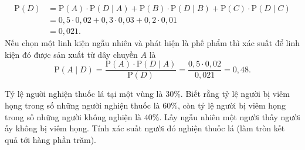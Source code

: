 \begin{bt}
{\begin{align*}
			\mathrm{P}\left(D\right)&=\mathrm{P}\left(A\right)\cdot\mathrm{P}\left(D\mid A\right)+\mathrm{P}\left(B\right)\cdot\mathrm{P}\left(D\mid B\right)+\mathrm{P}\left(C\right)\cdot\mathrm{P}\left(D\mid  C\right)\\
			&=0{,}5\cdot0{,}02+0{,}3\cdot0{,}03+0{,}2\cdot0{,}01\\ 
			&=0{,}021. 
		\end{align*}
		Nếu chọn một linh kiện ngẫu nhiên và phát hiện là phế phẩm thì xác suất để linh kiện đó được sản xuất từ  dây chuyền $A$ là
		\[\mathrm{P}\left(A\mid D\right)=\dfrac{\mathrm{P}\left(A\right)\cdot\mathrm{P}\left(D\mid A\right)}{\mathrm{P}\left(D\right)}=\dfrac{0{,}5\cdot0{,}02}{0{,}021}=0{,}48.\] 
	} 
\end{bt}

\begin{bt}%
	Tỷ lệ người nghiện thuốc lá tại một vùng là $30\% $. Biết rằng tỷ lệ người bị viêm họng trong số những người nghiện thuốc là $60\% $, còn tỷ lệ người bị viêm họng trong số những người không nghiện là $40\% $. Lấy ngẫu nhiên một người thấy người ấy không bị viêm họng. Tính xác suất người đó nghiện thuốc  lá (làm tròn kết quả tới hàng phần trăm).
\end{bt}

